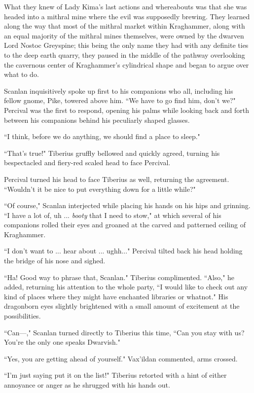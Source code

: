 What they knew of Lady Kima's last actions and whereabouts was that she was headed into a mithral mine where the evil was supposedly brewing. They learned along the way that most of the mithral market within Kraghammer, along with an equal majority of the mithral mines themselves, were owned by the dwarven Lord Nostoc Greyspine; this being the only name they had with any definite ties to the deep earth quarry, they paused in the middle of the pathway overlooking the cavernous center of Kraghammer's cylindrical shape and began to argue over what to do. 

Scanlan inquisitively spoke up first to his companions who all, including his fellow gnome, Pike, towered above him. ``We have to go find him, don't we?" Percival was the first to respond, opening his palms while looking back and forth between his companions behind his peculiarly shaped glasses.
    
``I think, before we do anything, we should find a place to sleep."

``That's true!" Tiberius gruffly bellowed and quickly agreed, turning his bespectacled and fiery-red scaled head to face Percival.

Percival turned his head to face Tiberius as well, returning the agreement. ``Wouldn't it be nice to put everything down for a little while?" 

``Of course," Scanlan interjected while placing his hands on his hips and grinning. ``I have a lot of, uh ... \textit{booty} that I need to stow," at which several of his companions rolled their eyes and groaned at the carved and patterned ceiling of Kraghammer.

``I don't want to  ... hear about ... ughh..." Percival tilted back his head holding the bridge of his nose and sighed.

``Ha! Good way to phrase that, Scanlan." Tiberius complimented. ``Also," he added, returning his attention to the whole party, ``I would like to check out any kind of places where they might have enchanted libraries or whatnot." His dragonborn eyes slightly brightened with a small amount of excitement at the possibilities.

``Can---," Scanlan turned directly to Tiberius this time, ``Can you stay with us? You're the only one speaks Dwarvish."

``Yes, you are getting ahead of yourself." Vax'ildan commented, arms crossed.

``I'm just saying put it on the list!" Tiberius retorted with a hint of either annoyance or anger as he shrugged with his hands out.

